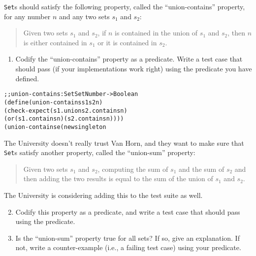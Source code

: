 \documentclass[12pt]{article}                   %
\begin{document}
\begin{problem}
\verb|Set|s should satisfy the following property, called the
``union-contains'' property, for any number $n$ and
any two sets $s_1$ and $s_2$:

\begin{quote}
Given two sets $s_1$ and $s_2$, if $n$ is contained in the union of $s_1$ and $s_2$, then $n$ is either
contained in $s_1$ or it is contained in $s_2$.
\end{quote}

\begin{enumerate}
\item Codify the ``union-contains'' property as a predicate.  Write a
  test case that should pass (if your implementations work right) using the
  predicate you have defined.
\end{enumerate}

\ifrubric
\begin{alltt}
;; union-contains : Set Set Number -> Boolean
(define (union-contains s1 s2 n)
  (check-expect (s1 . union s2 . contains n)
                (or (s1 . contains n) (s2 . contains n))))
(union-contains e (new singleton% 17) 17)
\end{alltt}
\else
{}
\fi

\newpage
\noindent
The University doesn't really trust Van Horn, and they want to make
sure that \verb|Set|s satisfy another property, called the
``union-sum'' property:

\begin{quote}
Given two sets $s_1$ and $s_2$, computing the sum of $s_1$ and the sum
of $s_2$ and then adding the two results is equal to the sum of the
union of  $s_1$ and $s_2$.
\end{quote}

\noindent
The University is considering adding this to the test suite as well.

\begin{enumerate}
\setcounter{enumi}{1}

\item Codify this property as a predicate, and write a test case that
  should pass using the predicate.

\item Is the ``union-sum'' property true for all sets?  If so,
  give an explanation.  If not, write a counter-example (i.e., a
  failing test case) using your predicate.


\end{enumerate}
\end{problem}
\end{document}
